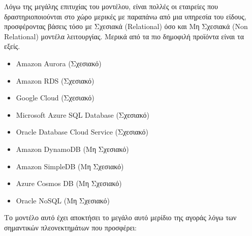 \documentclass{article}
\begin{document}
Λόγω της μεγάλης επιτυχίας του μοντέλου, είναι πολλές οι εταιρείες που δραστηριοποιούνται στο χώρο μερικές με παραπάνω από μια υπηρεσία του είδους, προσφέροντας βάσεις τόσο με Σχεσιακά (Relational) όσο και Μη Σχεσιακά (Non Relational) μοντέλα λειτουργίας. Μερικά από τα πιο δημοφιλή προϊόντα είναι τα εξείς.
\begin{itemize}
\item Amazon Aurora (Σχεσιακό)
\item Amazon RDS (Σχεσιακό)
\item Google Cloud (Σχεσιακό)
\item Microsoft Azure SQL Database (Σχεσιακό)
\item Oracle Database Cloud Service (Σχεσιακό)
\item Amazon DynamoDB (Μη Σχεσιακό)
\item Amazon SimpleDB (Μη Σχεσιακό)
\item Azure Cosmos DB (Μη Σχεσιακό)
\item Oracle NoSQL (Μη Σχεσιακό)
\end{itemize}
Το μοντέλο αυτό έχει αποκτήσει το μεγάλο αυτό μερίδιο της αγοράς λόγω των σημαντικών πλεονεκτημάτων που προσφέρει:
\end{document}
